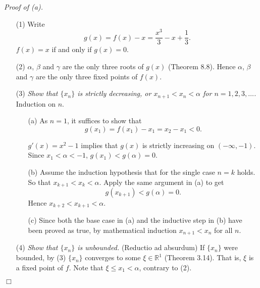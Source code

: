 \documentclass{article}
\begin{document}
\emph{Proof of (a).}
\begin{enumerate}
\item[(1)]
Write
\[
  g(x) = f(x) - x = \frac{x^3}{3} - x + \frac{1}{3}.
\]
$f(x) = x$ if and only if $g(x) = 0$.

\item[(2)]
$\alpha$, $\beta$ and $\gamma$ are the only three roots of $g(x)$ (Theorem 8.8).
Hence $\alpha$, $\beta$ and $\gamma$ are the only three fixed points of $f(x)$.

\item[(3)]
\emph{Show that $\{x_n\}$ is strictly decreasing,
or $x_{n+1} < x_n < \alpha$ for $n = 1, 2, 3, \ldots$.}
Induction on $n$.
  \begin{enumerate}
  \item[(a)]
  As $n = 1$, it suffices to show that
  \[
    g(x_1) = f(x_1) - x_1 = x_2 - x_1 < 0.
  \]

  $g'(x) = x^2 - 1$ implies that $g(x)$ is strictly increasing on $(-\infty,-1)$.
  Since $x_1 < \alpha < -1$, $g(x_1) < g(\alpha) = 0$.

  \item[(b)]
  Assume the induction hypothesis that for the single case $n = k$ holds.
  So that $x_{k+1} < x_k < \alpha$.
  Apply the same argument in (a) to get
  \[
    g(x_{k+1}) < g(\alpha) = 0.
  \]
  Hence $x_{k+2} < x_{k+1} < \alpha$.

  \item[(c)]
  Since both the base case in (a) and
  the inductive step in (b) have been proved as true,
  by mathematical induction $x_{n+1} < x_n$ for all $n$.
  \end{enumerate}

\item[(4)]
\emph{Show that $\{x_n\}$ is unbounded.}
(Reductio ad absurdum)
If $\{x_n\}$ were bounded,
by (3) $\{x_n\}$ converges to some $\xi \in \mathbb{R}^1$ (Theorem 3.14).
That is, $\xi$ is a fixed point of $f$.
Note that $\xi \leq x_1 < \alpha$, contrary to (2).
\end{enumerate}
$\Box$ \\
\end{document}
